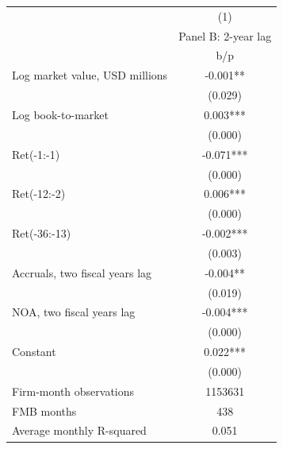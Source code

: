 {
\def\sym#1{\ifmmode^{#1}\else\(^{#1}\)\fi}
\begin{tabular}{l*{1}{c}}
\hline\hline
                    &\multicolumn{1}{c}{(1)}\\
                    &\multicolumn{1}{c}{Panel B: 2-year lag}\\
                    &         b/p   \\
\hline
Log market value, USD millions&      -0.001** \\
                    &     (0.029)   \\
Log book-to-market  &       0.003***\\
                    &     (0.000)   \\
Ret(-1:-1)          &      -0.071***\\
                    &     (0.000)   \\
Ret(-12:-2)         &       0.006***\\
                    &     (0.000)   \\
Ret(-36:-13)        &      -0.002***\\
                    &     (0.003)   \\
Accruals, two fiscal years lag&      -0.004** \\
                    &     (0.019)   \\
NOA, two fiscal years lag&      -0.004***\\
                    &     (0.000)   \\
Constant            &       0.022***\\
                    &     (0.000)   \\
\hline
Firm-month observations&     1153631   \\
FMB months          &         438   \\
Average monthly R-squared&       0.051   \\
\hline\hline
\end{tabular}
}
